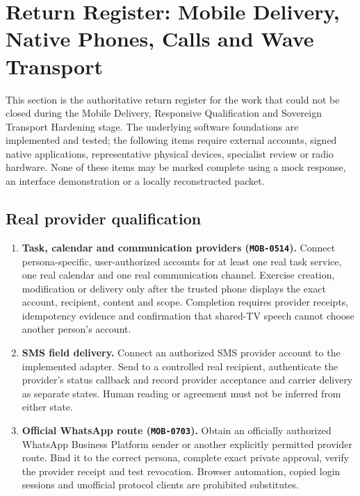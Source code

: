 \section{Return Register: Mobile Delivery, Native Phones, Calls and Wave Transport}
\label{sec:pilot-mobile-delivery-calls-wave-return-register}

This section is the authoritative return register for the work that could not be
closed during the Mobile Delivery, Responsive Qualification and Sovereign Transport
Hardening stage.  The underlying software foundations are implemented and tested;
the following items require external accounts, signed native applications,
representative physical devices, specialist review or radio hardware.  None of these
items may be marked complete using a mock response, an interface demonstration or a
locally reconstructed packet.

\subsection{Real provider qualification}

\begin{enumerate}
  \item \textbf{Task, calendar and communication providers
  (\texttt{MOB-0514}).} Connect persona-specific, user-authorized accounts for at
  least one real task service, one real calendar and one real communication channel.
  Exercise creation, modification or delivery only after the trusted phone displays
  the exact account, recipient, content and scope.  Completion requires provider
  receipts, idempotency evidence and confirmation that shared-TV speech cannot choose
  another person's account.

  \item \textbf{SMS field delivery.} Connect an authorized SMS provider account to
  the implemented adapter.  Send to a controlled real recipient, authenticate the
  provider's status callback and record provider acceptance and carrier delivery as
  separate states.  Human reading or agreement must not be inferred from either
  state.

  \item \textbf{Official WhatsApp route (\texttt{MOB-0703}).} Obtain an officially
  authorized WhatsApp Business Platform sender or another explicitly permitted
  provider route.  Bind it to the correct persona, complete exact private approval,
  verify the provider receipt and test revocation.  Browser automation, copied login
  sessions and unofficial protocol clients are prohibited substitutes.
\end{enumerate}

